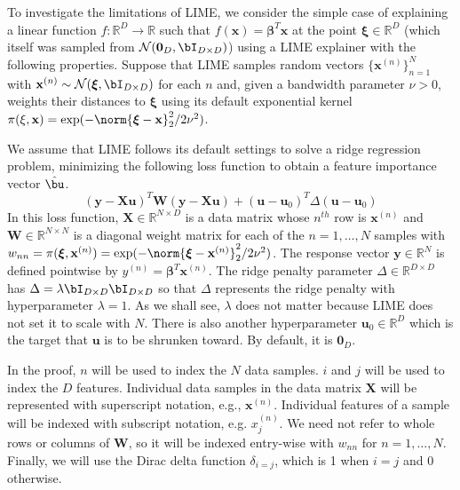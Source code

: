\documentclass[11pt]{article}
\begin{document}
            To investigate the limitations of LIME, we consider the simple case of explaining a linear function $f:\mathbb{R}^D \rightarrow \mathbb{R}$ such that $f(\mathbf{x}) = \boldsymbol{\beta}^T \mathbf{x}$ at the point $\boldsymbol{\xi}\in \mathbb{R}^D$ (which itself was sampled from $\mathcal{N}(\mathbf{0}_D, \bI_{D\times D})$) using a LIME explainer with the following properties. Suppose that LIME samples random vectors $\{\mathbf{x}^{(n)}\}_{n=1}^N$ with $\mathbf{x}^{(n)} \sim \mathcal{N}(\boldsymbol{\xi},\bI_{D\times D})$ for each $n$ and, given a bandwidth parameter $\nu > 0$, weights their distances to $\boldsymbol{\xi}$ using its default exponential kernel $\pi(\xi,\mathbf{x}) = \exp(-\norm{\boldsymbol{\xi} - \mathbf{x}}_2^2/2\nu^2)$. 
            
        We assume that LIME follows its default settings to solve a ridge regression problem, minimizing the following loss function to obtain a feature importance vector $\hat{\bu}$. 
        \begin{equation*}
            (\mathbf{y} - \mathbf{X}\mathbf{u})^T \mathbf{W}(\mathbf{y} - \mathbf{X}\mathbf{u}) + (\mathbf{u} - \mathbf{u}_0)^T \Delta(\mathbf{u} - \mathbf{u}_0)
        \end{equation*}
        In this loss function, $\mathbf{X} \in \mathbb{R}^{N\times D}$ is a data matrix  whose $n^{th}$ row is $\mathbf{x}^{(n)}$ and $\mathbf{W} \in \mathbb{R}^{N\times N}$ is a diagonal weight matrix for each of the $n=1,\ldots,N$ samples with $w_{nn} = \pi(\boldsymbol{\xi},\mathbf{x}^{(n)}) = \exp(-\norm{\boldsymbol{\xi} - \mathbf{x}^{(n)}}_2^2/2\nu^2)$. The response vector $\mathbf{y}\in \mathbb{R}^N$ is defined pointwise by $y^{(n)} = \boldsymbol{\beta}^T \mathbf{x}^{(n)}$. The ridge penalty parameter $\Delta\in \mathbb{R}^{D\times D}$ has $\Delta = \lambda \bI_{D\times D} \bI_{D\times D}$ so that $\Delta$ represents the ridge penalty with hyperparameter $\lambda=1$. As we shall see, $\lambda$ does not matter because LIME does not set it to scale with $N$. There is also another hyperparameter $\mathbf{u}_0 \in \mathbb{R}^D$ which is the target that $\mathbf{u}$ is to be shrunken toward. By default, it is $\mathbf{0}_D$. 

        In the proof, $n$ will be used to index the $N$ data samples. $i$ and $j$ will be used to index the $D$ features. Individual data samples in the data matrix $\mathbf{X}$ will be represented with superscript notation, e.g., $\mathbf{x}^{(n)}$. Individual features of a sample will be indexed with subscript notation, e.g. $x^{(n)}_j$. We need not refer to whole rows or columns of $\mathbf{W}$, so it will be indexed entry-wise with $w_{nn}$ for $n=1,\ldots,N$. Finally, we will use the Dirac delta function $\delta_{i=j}$, which is 1 when $i=j$ and 0 otherwise. 
\end{document}
